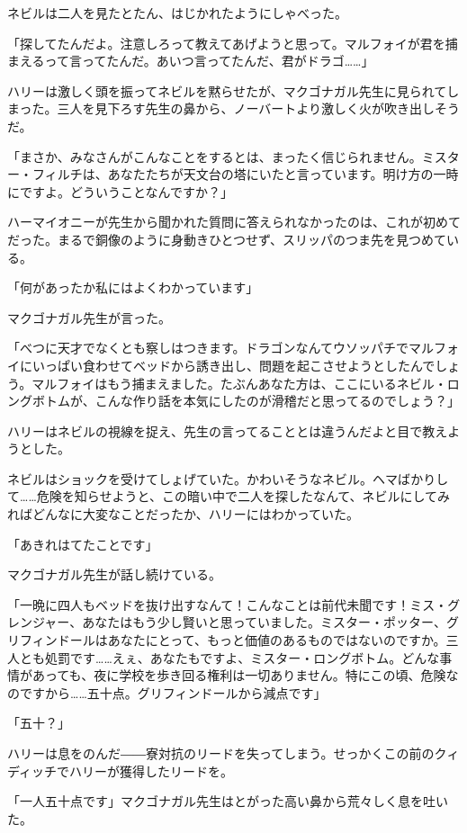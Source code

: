 \documentclass[10pt,a4paper]{article}
\begin{document}
\begin{CJK}{UTF8}{min}
ネビルは二人を見たとたん、はじかれたようにしゃべった。

「探してたんだよ。注意しろって教えてあげようと思って。マルフォイが君を捕まえるって言ってたんだ。あいつ言ってたんだ、君がドラゴ……」

ハリーは激しく頭を振ってネビルを黙らせたが、マクゴナガル先生に見られてしまった。三人を見下ろす先生の鼻から、ノーバートより激しく火が吹き出しそうだ。

「まさか、みなさんがこんなことをするとは、まったく信じられません。ミスター・フィルチは、あなたたちが天文台の塔にいたと言っています。明け方の一時にですよ。どういうことなんですか？」

ハーマイオニーが先生から聞かれた質問に答えられなかったのは、これが初めてだった。まるで銅像のように身動きひとつせず、スリッパのつま先を見つめている。

「何があったか私にはよくわかっています」

マクゴナガル先生が言った。

「べつに天才でなくとも察しはつきます。ドラゴンなんてウソッパチでマルフォイにいっぱい食わせてベッドから誘き出し、問題を起こさせようとしたんでしょう。マルフォイはもう捕まえました。たぶんあなた方は、ここにいるネビル・ロングボトムが、こんな作り話を本気にしたのが滑稽だと思ってるのでしょう？」

ハリーはネビルの視線を捉え、先生の言ってることとは違うんだよと目で教えようとした。

ネビルはショックを受けてしょげていた。かわいそうなネビル。ヘマばかりして……危険を知らせようと、この暗い中で二人を探したなんて、ネビルにしてみればどんなに大変なことだったか、ハリーにはわかっていた。

「あきれはてたことです」

マクゴナガル先生が話し続けている。

「一晩に四人もベッドを抜け出すなんて！こんなことは前代未聞です！ミス・グレンジャー、あなたはもう少し賢いと思っていました。ミスター・ポッター、グリフィンドールはあなたにとって、もっと価値のあるものではないのですか。三人とも処罰です……えぇ、あなたもですよ、ミスター・ロングボトム。どんな事情があっても、夜に学校を歩き回る権利は一切ありません。特にこの頃、危険なのですから……五十点。グリフィンドールから減点です」

「五十？」

ハリーは息をのんだ――寮対抗のリードを失ってしまう。せっかくこの前のクィディッチでハリーが獲得したリードを。

「一人五十点です」マクゴナガル先生はとがった高い鼻から荒々しく息を吐いた。


\end{CJK}
\end{document}
